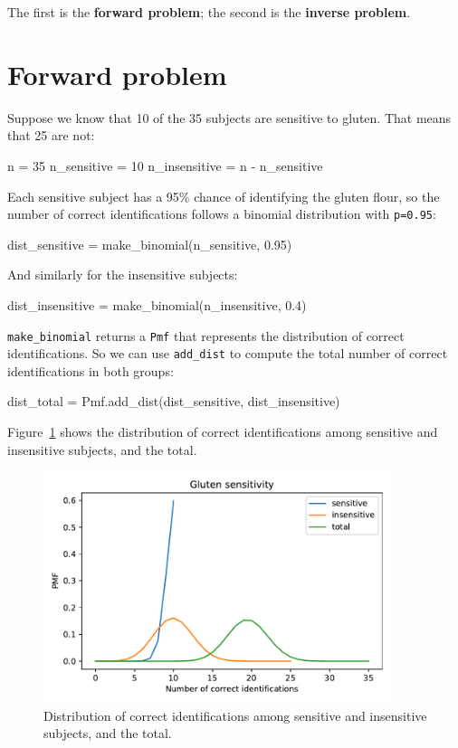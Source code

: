 \documentclass[12pt]{book}
\theoremstyle{exercise}
\newcommand{\py}[1]{{\tt #1}}%
\begin{document}
The first is the {\bf forward problem}; the second is the {\bf inverse problem}.


\section{Forward problem}

Suppose we know that 10 of the 35 subjects are sensitive to gluten.  That means that 25 are not:

\begin{code}
n = 35
n_sensitive = 10
n_insensitive = n - n_sensitive
\end{code}

Each sensitive subject has a 95\% chance of identifying the gluten flour, so the number of correct identifications follows a binomial distribution with \py{p=0.95}:

\begin{code}
dist_sensitive = make_binomial(n_sensitive, 0.95)
\end{code}

And similarly for the insensitive subjects:

\begin{code}
dist_insensitive = make_binomial(n_insensitive, 0.4)
\end{code}

\py{make_binomial} returns a \py{Pmf} that represents the distribution of correct identifications.
So we can use \py{add_dist} to compute the total number of correct identifications in both groups:

\begin{code}
dist_total = Pmf.add_dist(dist_sensitive, dist_insensitive)
\end{code}

Figure~\ref{fig05-02} shows the distribution of correct identifications among sensitive and insensitive subjects, and the total.

\begin{figure}
\centerline{\includegraphics[width=4in]{figs/fig05-02.pdf}}
\caption{Distribution of correct identifications among sensitive and insensitive subjects, and the total.}
\label{fig05-02}
\end{figure}
\end{document}
